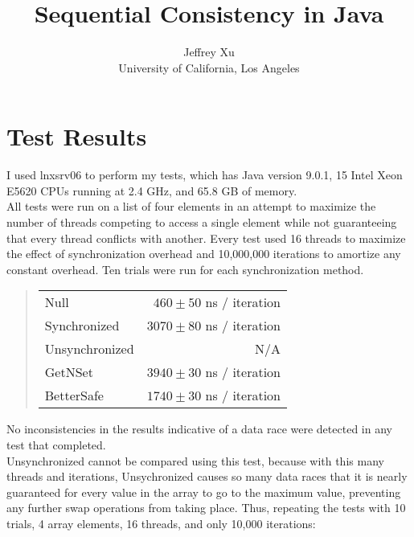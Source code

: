 \documentclass[letterpaper,twocolumn,10pt]{article}
\begin{document}
\date{}

\title{\Large \bf Sequential Consistency in Java}

\author{
{\rm Jeffrey Xu}\\
University of California, Los Angeles
} %

\maketitle

\thispagestyle{empty}

\section{Test Results}
I used lnxsrv06 to perform my tests, which has Java version 9.0.1, 15 Intel Xeon E5620 CPUs running at 2.4 GHz, and 65.8 GB of memory. \\
All tests were run on a list of four elements in an attempt to maximize the number of threads competing to access a single element while not guaranteeing that every thread conflicts with another. Every test used 16 threads to maximize the effect of synchronization overhead and 10,000,000 iterations to amortize any constant overhead. Ten trials were run for each synchronization method.
\begin{quote}
\begin{tabular}{lr}
Null&$460\pm50$ ns / iteration \\
Synchronized&$3070\pm80$ ns / iteration \\
Unsynchronized&N/A \\
GetNSet&$3940\pm30$ ns / iteration \\
BetterSafe&$1740\pm30$ ns / iteration \\
\end{tabular}
\end{quote}
No inconsistencies in the results indicative of a data race were detected in any test that completed. \\
Unsynchronized cannot be compared using this test, because with this many threads and iterations, Unsychronized causes so many data races that it is nearly guaranteed for every value in the array to go to the maximum value, preventing any further swap operations from taking place. Thus, repeating the tests with 10 trials, 4 array elements, 16 threads, and only 10,000 iterations:
\end{document}
